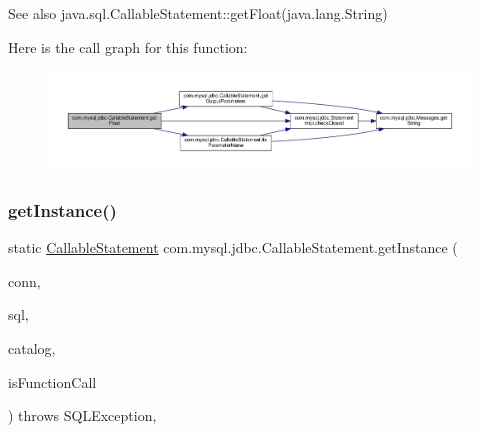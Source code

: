 \begin{DoxySeeAlso}{See also}
java.\+sql.\+Callable\+Statement\+::get\+Float(java.\+lang.\+String) 
\end{DoxySeeAlso}
Here is the call graph for this function\+:\nopagebreak
\begin{figure}[H]
\begin{center}
\leavevmode
\includegraphics[width=350pt]{classcom_1_1mysql_1_1jdbc_1_1_callable_statement_ad843b9b8fcff654bb2cfb548437624e0_cgraph}
\end{center}
\end{figure}
\mbox{\label{classcom_1_1mysql_1_1jdbc_1_1_callable_statement_a48501c01025bf2330e0dc26b7e43947e}} 
\subsubsection{\texorpdfstring{get\+Instance()}{getInstance()}\hspace{0.1cm}{\footnotesize\ttfamily [1/2]}}
{\footnotesize\ttfamily static \mbox{\hyperlink{classcom_1_1mysql_1_1jdbc_1_1_callable_statement}{Callable\+Statement}} com.\+mysql.\+jdbc.\+Callable\+Statement.\+get\+Instance (\begin{DoxyParamCaption}\item[{\mbox{\hyperlink{interfacecom_1_1mysql_1_1jdbc_1_1_my_s_q_l_connection}{My\+S\+Q\+L\+Connection}}}]{conn,  }\item[{String}]{sql,  }\item[{String}]{catalog,  }\item[{boolean}]{is\+Function\+Call }\end{DoxyParamCaption}) throws S\+Q\+L\+Exception\hspace{0.3cm}{\ttfamily [static]}, {\ttfamily [protected]}}

